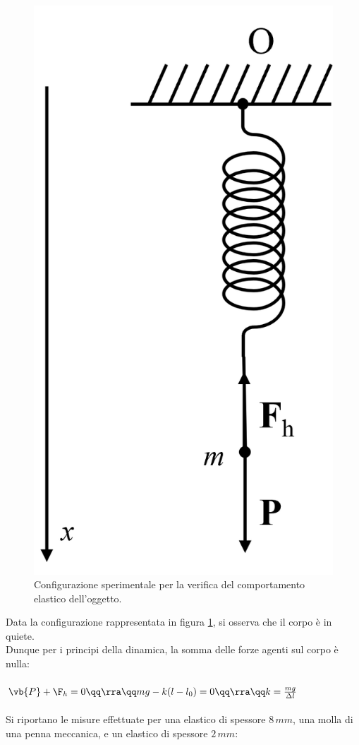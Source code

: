 \begin{figure}[h]
        \centering
        \includegraphics[scale = 0.5]{figures/sch1.png}
        \caption{Configurazione sperimentale per la verifica del comportamento elastico dell'oggetto.}
        \label{fig:figuraVerifica}
\end{figure}
\newpage
{}
Data la configurazione rappresentata in figura \ref{fig:figuraVerifica}, si osserva che il corpo è in quiete.\\ 
Dunque per i principi della dinamica, la somma delle forze agenti sul corpo è nulla:\\\\
$\vb{P} + \F_h = 0 \qq \rra \qq mg - k(l-l_0) = 0 \qq \rra \qq k = \frac{mg}{\Delta l}$\\ \\
Si riportano le misure effettuate per una elastico di spessore $8\,mm$, una molla di una penna meccanica, e un elastico di spessore $2\,mm$:\\
